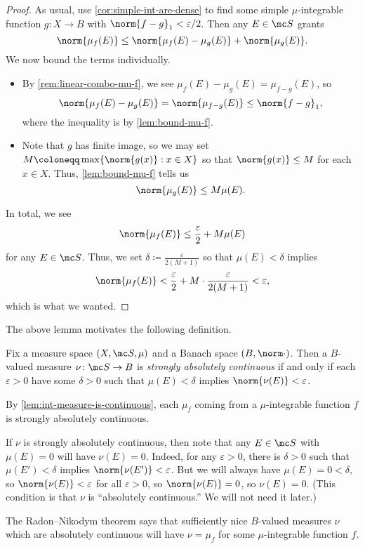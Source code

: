 \documentclass[../notes.tex]{subfiles}
\begin{document}
\begin{proof}
	As usual, use \autoref{cor:simple-int-are-dense} to find some simple $\mu$-integrable function $g\colon X\to B$ with $\norm{f-g}_1<\varepsilon/2$. Then any $E\in\mc S$ grants
	\[\norm{\mu_f(E)}\le\norm{\mu_f(E)-\mu_g(E)}+\norm{\mu_g(E)}.\]
	We now bound the terms individually.
	\begin{itemize}
		\item By \autoref{rem:linear-combo-mu-f}, we see $\mu_f(E)-\mu_g(E)=\mu_{f-g}(E)$, so
		\[\norm{\mu_f(E)-\mu_g(E)}=\norm{\mu_{f-g}(E)}\le\norm{f-g}_1,\]
		where the inequality is by \autoref{lem:bound-mu-f}.
		\item Note that $g$ has finite image, so we may set $M\coloneqq\max\{\norm{g(x)}:x\in X\}$ so that $\norm{g(x)}\le M$ for each $x\in X$. Thus, \autoref{lem:bound-mu-f} tells us
		\[\norm{\mu_g(E)}\le M\mu(E).\]
	\end{itemize}
	In total, we see
	\[\norm{\mu_f(E)}\le\frac\varepsilon2+M\mu(E)\]
	for any $E\in\mc S$. Thus, we set $\delta\coloneqq\frac\varepsilon{2(M+1)}$ so that $\mu(E)<\delta$ implies
	\[\norm{\mu_f(E)}<\frac\varepsilon2+M\cdot\frac\varepsilon{2(M+1)}<\varepsilon,\]
	which is what we wanted.
\end{proof}
The above lemma motivates the following definition.
\begin{definition}
	Fix a measure space $(X,\mc S,\mu)$ and a Banach space $(B,\norm\cdot)$. Then a $B$-valued measure $\nu\colon\mc S\to B$ is \textit{strongly absolutely continuous} if and only if each $\varepsilon>0$ have some $\delta>0$ such that $\mu(E)<\delta$ implies $\norm{\nu(E)}<\varepsilon$.
\end{definition}
\begin{example}
	By \autoref{lem:int-measure-is-continuous}, each $\mu_f$ coming from a $\mu$-integrable function $f$ is strongly absolutely continuous.
\end{example}
\begin{remark}
	If $\nu$ is strongly absolutely continuous, then note that any $E\in\mc S$ with $\mu(E)=0$ will have $\nu(E)=0$. Indeed, for any $\varepsilon>0$, there is $\delta>0$ such that $\mu(E')<\delta$ implies $\norm{\nu(E')}<\varepsilon$. But we will always have $\mu(E)=0<\delta$, so $\norm{\nu(E)}<\varepsilon$ for all $\varepsilon>0$, so $\norm{\nu(E)}=0$, so $\nu(E)=0$. (This condition is that $\nu$ is ``absolutely continuous.'' We will not need it later.)
\end{remark}
\begin{remark}
	The Radon--Nikodym theorem says that sufficiently nice $B$-valued measures $\nu$ which are absolutely continuous will have $\nu=\mu_f$ for some $\mu$-integrable function $f$.
\end{remark}
\end{document}
